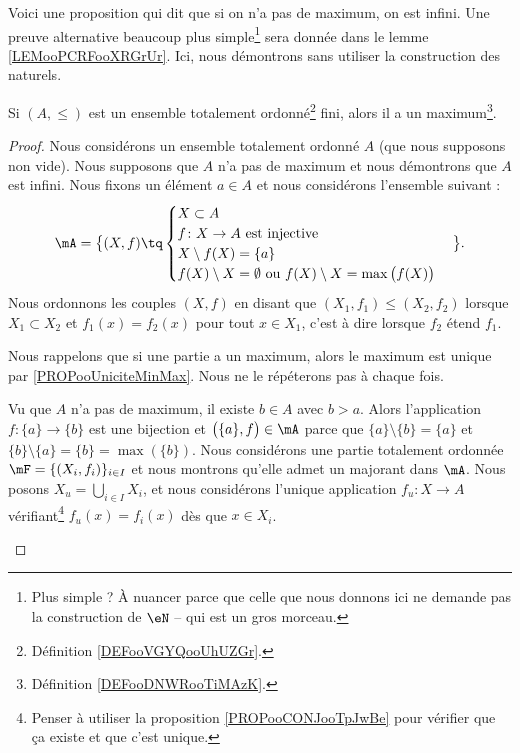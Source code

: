 Voici une proposition qui dit que si on n'a pas de maximum, on est infini. Une preuve alternative beaucoup plus simple\footnote{Plus simple ? À nuancer parce que celle que nous donnons ici ne demande pas la construction de \( \eN\) -- qui est un gros morceau.} sera donnée dans le lemme \ref{LEMooPCRFooXRGrUr}. Ici, nous démontrons sans utiliser la construction des naturels.
\begin{proposition}	\label{PROPooVZRVooAncMjb}
	Si \( (A,\leq)\) est un ensemble totalement ordonné\footnote{Définition \ref{DEFooVGYQooUhUZGr}.} fini, alors il a un maximum\footnote{Définition \ref{DEFooDNWRooTiMAzK}.}.
\end{proposition}

\begin{proof}
	Nous considérons un ensemble totalement ordonné \( A\) (que nous supposons non vide). Nous supposons que \( A\) n'a pas de maximum et nous démontrons que \( A\) est infini. Nous fixons un élément \( a\in A\) et nous considérons l'ensemble suivant :
	\begin{equation}
		\mA=\big\{ (X,f)\tq  \begin{cases}
			X\subset A                             \\
			f \colon X\to A  \text{ est injective} \\
			X\setminus f(X)=\{ a \}                \\
			f(X)\setminus X=\emptyset \text{ ou } f(X)\setminus X=\max\big( f(X) \big)
		\end{cases}\big\}.
	\end{equation}
	Nous ordonnons les couples \( (X,f)\) en disant que \( (X_1,f_1)\leq (X_2,f_2)\) lorsque \( X_1\subset X_2\) et \( f_1(x)=f_2(x)\) pour tout \( x\in X_1\), c'est à dire lorsque \( f_2\) étend \( f_1\).

	Nous rappelons que si une partie a un maximum, alors le maximum est unique par \ref{PROPooUniciteMinMax}. Nous ne le répéterons pas à chaque fois.

	\begin{subproof}
		Vu que \( A\) n'a pas de maximum, il existe \( b\in A\) avec \( b>a\). Alors l'application \(f \colon \{ a \}\to \{ b \}  \) est une bijection et \( \big( \{ a \},f \big)\in \mA\) parce que \( \{ a \}\setminus\{ b \}=\{ a \}\) et \( \{ b \}\setminus\{ a \}=\{ b \}=\max(\{ b \})\).
		Nous considérons une partie totalement ordonnée \( \mF=\{ (X_i,f_i) \}_{i\in I}\) et nous montrons qu'elle admet un majorant dans \( \mA\). Nous posons \( X_u=\bigcup_{i\in I}X_i\), et nous considérons l'unique application \(f_u \colon X\to A  \) vérifiant\footnote{Penser à utiliser la proposition \ref{PROPooCONJooTpJwBe} pour vérifier que ça existe et que c'est unique.} \( f_u(x)=f_i(x)\) dès que \( x\in X_i\).


\end{subproof}
\end{proof}

